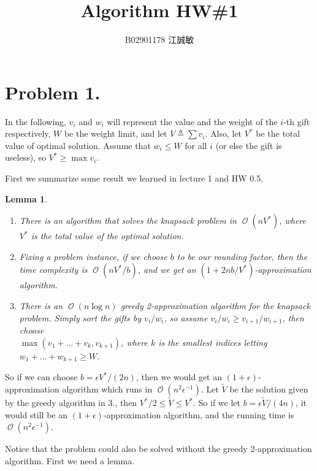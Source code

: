 \documentclass[12pt, a4paper]{article}
\title{Algorithm HW\#1}
\author{B02901178 江誠敏}
\newtheorem{lemma}{Lemma}
\newcommand{\defeq}{\triangleq}
\DeclareMathOperator*{\ord}{\mathcal{O}}
\begin{document}
\maketitle
\section{Problem 1.}

In the following, $v_i$ and $w_i$ will represent the value and the weight of the $i$-th gift respectively,
$W$ be the weight limit, and let $V \defeq \sum v_i$. Also, let $V^*$ be the total value of optimal solution.
Assume that $w_i \leq W$ for all $i$ (or else the gift is useless), so $V^* \geq \max v_i$.

First we summarize some result we learned in lecture 1 and HW 0.5. \medskip

\begin{lemma} \hfill \label{lemma:recap}
  \begin{enumerate}
    \item There is an algorithm that solves the knapsack problem in $\ord(n V^*)$, where
      $V^*$ is the total value of the optimal solution.
    \item Fixing a problem instance, if we choose $b$ to be our rounding factor,
      then the time complexity is $\ord(n V^* / b)$,
      and we get an $(1 + 2nb / V^*)$-approximation algorithm. \label{lemma:ks-approx-algo}
    \item There is an $\ord(n \log n)$ greedy 2-approximation algorithm for the knapsack problem.
      Simply sort the gifts by $v_i / w_i$, so assume $v_i / w_i \geq v_{i+1} / w_{i+1}$, then choose \\
      $\max(v_1 + \dots + v_k, v_{k+1})$, where $k$ is the smallest indices
      letting $w_1 + \dots + w_{k+1} \geq W$.
  \end{enumerate}
\end{lemma}

So if we can choose $b = \epsilon V^* / (2n)$, then we would get an $(1+\epsilon)$-approximation algorithm
which runs in $\ord(n^2 \epsilon^{-1})$. Let $\tilde{V}$ be the solution given by the greedy algorithm
in 3., then $V^* / 2 \leq \tilde{V} \leq V^*$. So if we let $b = \epsilon
\tilde{V} / (4n)$, it would still be an $(1+\epsilon)$-approximation algorithm, and the running time
is $\ord(n^2 \epsilon^{-1})$.

Notice that the problem could also be solved without the greedy 2-approximation algorithm.
First we need a lemma. \medskip
\end{document}
